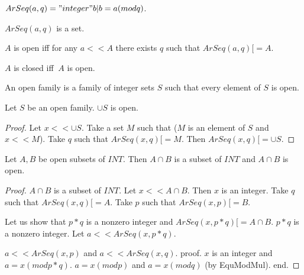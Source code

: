 \documentclass{article}
\begin{document}
  \begin{forthel}

    \begin{definition}[ArSeq]
      $ArSeq(a,q) = { "integer" b | b = a (mod q) }$.
    \end{definition}

    \begin{lemma}
      $ArSeq(a,q)$ is a set.
    \end{lemma}

    \begin{definition}[Open]
      $A$ is open iff for any $a << A$ there exists $q$ such that $ArSeq(a,q) [= A$.
    \end{definition}

    \begin{definition}[Closed]
      $A$ is closed iff $~A$ is open.
    \end{definition}

    \begin{definition}[OpenIntegerSets]
      An open family is a family of integer sets $S$ such that every element of $S$ is open.
    \end{definition}

    \begin{lemma}[UnionOpen]
      Let $S$ be an open family. $\cup S$ is open.
    \end{lemma}
    \begin{proof}
      Let $x << \cup S$. Take a set $M$ such that ($M$ is an element of $S$ and $x << M$). Take $q$ such that $ArSeq(x,q) [= M$. Then $ArSeq(x,q) [= \cup S$.
    \end{proof}

    \begin{lemma}[InterOpen]
      Let $A,B$ be open subsets of $INT$. Then $A \cap B$ is a subset of $INT$ and $A \cap B$ is open.
    \end{lemma}
    \begin{proof}
      $A \cap B$ is a subset of $INT$. Let $x << A \cap B$. Then $x$ is an integer. Take $q$ such that $ArSeq(x,q) [= A$. Take $p$ such that $ArSeq(x,p) [= B$.

      Let us show that $p*q$ is a nonzero integer and $ArSeq(x, p * q) [= A \cap B$.
        $p*q$ is a nonzero integer. Let $a << ArSeq(x, p * q)$.

        $a << ArSeq (x, p)$ and $a << ArSeq (x, q)$.
        proof.
          $x$ is an integer and $a = x (mod p * q)$. $a = x (mod p)$ and $a = x (mod q)$ (by EquModMul).
        end.


\end{proof}
\end{forthel}
\end{document}
